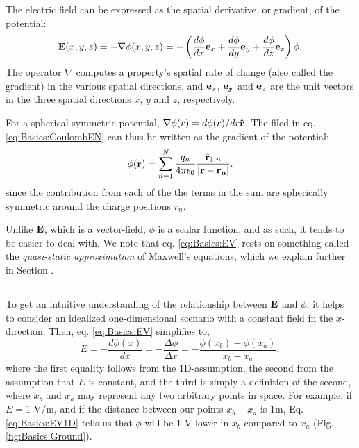 The electric field can be expressed as the spatial derivative, or gradient, of the potential:
\begin{equation}
{\bf E}(x,y,z) = - \nabla \phi(x,y,z) = - \left(\frac{d\phi}{dx} {\bf e}_x  + \frac{d\phi}{dy} {\bf e}_y + \frac{d\phi}{dz} {\bf e}_z \right) \phi.
\label{eq:Basics:EV}
\end{equation}
The operator $\nabla$ computes a property's spatial rate of change (also called the gradient) in the various spatial directions, and ${\bf e}_x$, ${\bf e_y}$ and  ${\bf e}_z$ are the unit vectors in the three spatial directions $x$, $y$ and $z$, respectively. 

For a spherical symmetric potential, $\nabla \phi(r) = d\phi(r)/dr {\bf \hat{r}}$. The filed in eq.  \ref{eq:Basics:CoulombEN} can thus be written as the gradient of the potential: 
\begin{equation}
{\phi}({\bf r}) = \sum_{n=1}^{N}  \frac{q_n}{4\pi \epsilon_0} \frac{\hat{{\bf r}}_{1,n}}{|{\bf r}-{\bf r_n}|}.
\label{eq:Basics:CoulombPhiN}
\end{equation}
since the contribution from each of the the terms in the sum are spherically symmetric around the charge positions $r_n$.

Unlike ${\bf E}$, which is a vector-field, $\phi$ is a scalar function, and as such, it tends to be easier to deal with. We note that eq. \ref{eq:Basics:EV} rests on something called the \textit{quasi-static approximation} of Maxwell's equations, which we explain further in Section \label{sec:Basics:Maxwell}. 



\subsection{}
\label{sec:Basics:Ground} 
To get an intuitive understanding of the relationship between ${\bf E}$ and $\phi$, it helps to consider an idealized one-dimensional scenario with a constant field in the $x$-direction. Then, eq. \ref{eq:Basics:EV} simplifies to,
\begin{equation}
E = -\frac{d\phi(x)}{dx} = -\frac{\Delta \phi}{\Delta x} = -\frac{\phi(x_b)-\phi(x_a)}{x_b-x_a},
\label{eq:Basics:EV1D}
\end{equation}
where the first equality follows from the 1D-assumption, the second from the assumption that $E$ is constant, and the third is simply a definition of the second, where $x_b$ and $x_a$ may represent any two arbitrary points in space. For example, if $E = 1$ V/m, and if the distance between our points $x_b-x_a$ is 1m, Eq. \ref{eq:Basics:EV1D} tells us that $\phi$ will be 1 V  lower in $x_b$ compared to $x_a$ (Fig. \ref{fig:Basics:Ground}).

